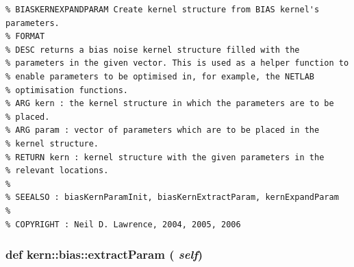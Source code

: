 \footnotesize\begin{verbatim}% BIASKERNEXPANDPARAM Create kernel structure from BIAS kernel's parameters.
% FORMAT
% DESC returns a bias noise kernel structure filled with the
% parameters in the given vector. This is used as a helper function to
% enable parameters to be optimised in, for example, the NETLAB
% optimisation functions.
% ARG kern : the kernel structure in which the parameters are to be
% placed.
% ARG param : vector of parameters which are to be placed in the
% kernel structure.
% RETURN kern : kernel structure with the given parameters in the
% relevant locations.
%
% SEEALSO : biasKernParamInit, biasKernExtractParam, kernExpandParam
%
% COPYRIGHT : Neil D. Lawrence, 2004, 2005, 2006

\end{verbatim}
\normalsize
 \hypertarget{classkern_1_1bias_f9b0c3a62a227ad4480e501e3ebb10f4}{
\subsubsection[{extractParam}]{\setlength{\rightskip}{0pt plus 5cm}def kern::bias::extractParam ( {\em self})}}
\label{classkern_1_1bias_f9b0c3a62a227ad4480e501e3ebb10f4}




